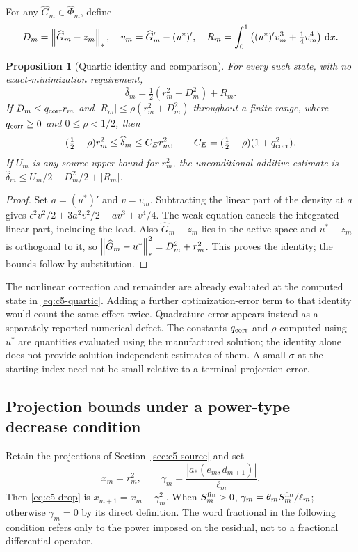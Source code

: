 \documentclass[11pt]{article}
\newtheorem{proposition}[theorem]{Proposition}
\theoremstyle{remark}
\begin{document}
For any $\widehat G_m\in\widehat\Phi_m$, define
\[
 D_m=\left\lVert\widehat G_m-z_m\right\rVert_*,\quad
 v_m=\widehat G_m'-(u^*)',\quad
 R_m=\int_0^1\left((u^*)'v_m^3+\tfrac14v_m^4\right)\,\mathrm d x .
\]
\begin{proposition}[Quartic identity and comparison]
\label{prop:c5-quartic}
For every such state, with no exact-minimization requirement,
\begin{equation}
 \widehat\delta_m=\tfrac12(r_m^2+D_m^2)+R_m.
 \label{eq:c5-quartic}
\end{equation}
If $D_m\leq q_{\rm corr}r_m$ and
$|R_m|\leq\rho(r_m^2+D_m^2)$ throughout a finite range, where
$q_{\rm corr}\geq0$ and $0\leq\rho<1/2$, then
\begin{equation}
 (\tfrac12-\rho)r_m^2\leq\widehat\delta_m
 \leq C_Er_m^2,\qquad C_E=(\tfrac12+\rho)(1+q_{\rm corr}^2).
 \label{eq:c5-quartic-comparison}
\end{equation}
If $U_m$ is any source upper bound for $r_m^2$, the unconditional
additive estimate is
$\widehat\delta_m\leq U_m/2+D_m^2/2+|R_m|$.
\end{proposition}
\begin{proof}
Set $a=(u^*)'$ and $v=v_m$. Subtracting the linear part of the density
at $a$ gives
$\epsilon^2v^2/2+3a^2v^2/2+av^3+v^4/4$.
The weak equation cancels the integrated linear part, including the load.
Also $\widehat G_m-z_m$ lies in the active space and
$u^*-z_m$ is orthogonal to it, so
$\left\lVert\widehat G_m-u^*\right\rVert_*^2=D_m^2+r_m^2$.
This proves the identity; the bounds follow by substitution.
\end{proof}

The nonlinear correction and remainder are already evaluated at the computed
state in \eqref{eq:c5-quartic}. Adding a further optimization-error term
to that identity would count the same effect twice.
Quadrature error appears instead as a separately reported numerical defect.
The constants $q_{\rm corr}$ and $\rho$ computed using $u^*$ are
quantities evaluated using the manufactured solution; the identity alone does not provide
solution-independent estimates of them. A small $\sigma$ at the starting index need
not be small relative to a terminal projection error.

\subsection{Projection bounds under a power-type decrease condition}
\label{sec:c5-power}

Retain the projections of Section~\ref{sec:c5-source} and set
\[
 x_m=r_m^2,\qquad
 \gamma_m=\frac{|a_*(e_m,d_{m+1})|}{\ell_m}.
\]
Then \eqref{eq:c5-drop} is $x_{m+1}=x_m-\gamma_m^2$.
When $S_m^{\rm fin}>0$, $\gamma_m=\theta_mS_m^{\rm fin}/\ell_m$;
otherwise $\gamma_m=0$ by its direct definition.
The word fractional in the following condition refers only to the power
imposed on the residual, not to a fractional differential operator.
\end{document}
